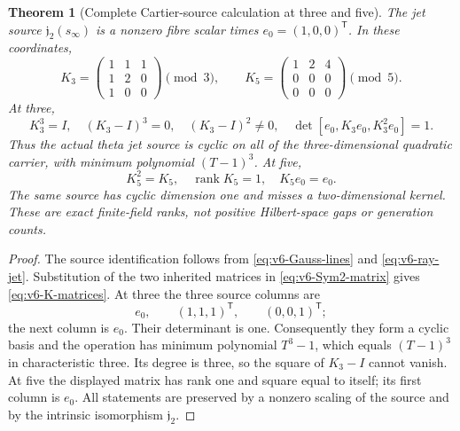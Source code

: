 \documentclass[11pt]{article}
\newtheorem{theorem}{Theorem}[section]
\theoremstyle{definition}
\theoremstyle{remark}
\newcommand{\rank}{\operatorname{rank}}
\begin{document}
\begin{theorem}[Complete Cartier-source calculation at three and five]
\label{thm:v6-Cartier-cyclic}
The jet source $\mathfrak j_2(s_\infty)$ is a nonzero fibre scalar times
$e_0=(1,0,0)^{\mathsf T}$. In these coordinates,
\begin{equation}
 \boxed{
 K_3=\begin{pmatrix}1&1&1\\1&2&0\\1&0&0\end{pmatrix}\pmod3,
 \qquad
 K_5=\begin{pmatrix}1&2&4\\0&0&0\\0&0&0\end{pmatrix}\pmod5.}
 \label{eq:v6-K-matrices}
\end{equation}
At three,
\begin{equation}
 \boxed{
 K_3^3=I,\quad (K_3-I)^3=0,\quad (K_3-I)^2\ne0,\quad
 \det[e_0,K_3e_0,K_3^2e_0]=1.}
 \label{eq:v6-K3-cyclic}
\end{equation}
Thus the actual theta jet source is cyclic on all of the three-dimensional
quadratic carrier, with minimum polynomial $(T-1)^3$.
At five,
\begin{equation}
 \boxed{K_5^2=K_5,\quad\rank K_5=1,\quad K_5e_0=e_0.}
 \label{eq:v6-K5-cyclic}
\end{equation}
The same source has cyclic dimension one and misses a two-dimensional
kernel. These are exact finite-field ranks, not positive Hilbert-space
gaps or generation counts.
\end{theorem}
\begin{proof}
The source identification follows from \eqref{eq:v6-Gauss-lines} and
\eqref{eq:v6-ray-jet}. Substitution of the two inherited matrices in
\eqref{eq:v6-Sym2-matrix} gives \eqref{eq:v6-K-matrices}.
At three the three source columns are
\[
 e_0,\qquad(1,1,1)^{\mathsf T},\qquad(0,0,1)^{\mathsf T};
\]
the next column is $e_0$. Their determinant is one. Consequently they
form a cyclic basis and the operation has minimum polynomial $T^3-1$,
which equals $(T-1)^3$ in characteristic three. Its degree is three,
so the square of $K_3-I$ cannot vanish. At five the displayed matrix
has rank one and square equal to itself; its first column is $e_0$.
All statements are preserved by a nonzero scaling of the source and
by the intrinsic isomorphism $\mathfrak j_2$.
\end{proof}
\end{document}

